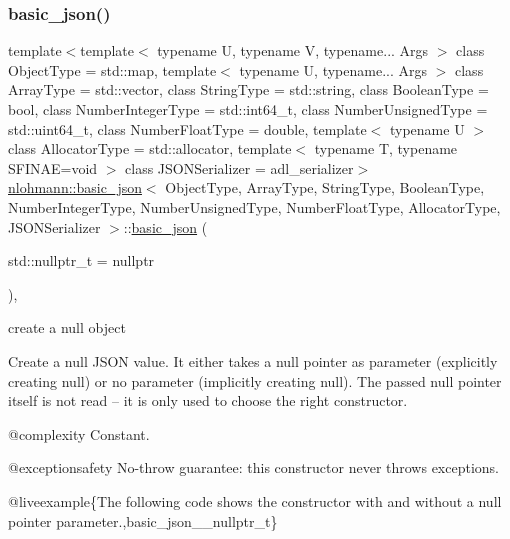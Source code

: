 \subsubsection{\texorpdfstring{basic\_json()}{basic\_json()}\hspace{0.1cm}{\footnotesize\ttfamily [2/9]}}
{\footnotesize\ttfamily template$<$template$<$ typename U, typename V, typename... Args $>$ class Object\+Type = std\+::map, template$<$ typename U, typename... Args $>$ class Array\+Type = std\+::vector, class String\+Type  = std\+::string, class Boolean\+Type  = bool, class Number\+Integer\+Type  = std\+::int64\+\_\+t, class Number\+Unsigned\+Type  = std\+::uint64\+\_\+t, class Number\+Float\+Type  = double, template$<$ typename U $>$ class Allocator\+Type = std\+::allocator, template$<$ typename T, typename S\+F\+I\+N\+A\+E=void $>$ class J\+S\+O\+N\+Serializer = adl\+\_\+serializer$>$ \\
\mbox{\hyperlink{classnlohmann_1_1basic__json}{nlohmann\+::basic\+\_\+json}}$<$ Object\+Type, Array\+Type, String\+Type, Boolean\+Type, Number\+Integer\+Type, Number\+Unsigned\+Type, Number\+Float\+Type, Allocator\+Type, J\+S\+O\+N\+Serializer $>$\+::\mbox{\hyperlink{classnlohmann_1_1basic__json}{basic\+\_\+json}} (\begin{DoxyParamCaption}\item[{std\+::nullptr\+\_\+t}]{ = {\ttfamily nullptr} }\end{DoxyParamCaption})\hspace{0.3cm}{\ttfamily [inline]}, {\ttfamily [noexcept]}}



create a null object 

Create a {\ttfamily null} J\+S\+ON value. It either takes a null pointer as parameter (explicitly creating {\ttfamily null}) or no parameter (implicitly creating {\ttfamily null}). The passed null pointer itself is not read -- it is only used to choose the right constructor.

@complexity Constant.

@exceptionsafety No-\/throw guarantee\+: this constructor never throws exceptions.

@liveexample\{The following code shows the constructor with and without a null pointer parameter.,basic\+\_\+json\+\_\+\+\_\+nullptr\+\_\+t\}

